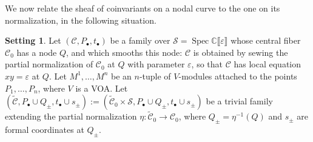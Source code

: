 \documentclass[12pt,a4paper,reqno]{amsart}
\numberwithin{equation}{section}
\theoremstyle{definition}
\newtheorem{setting}[theorem]{Setting}
\newcommand{\C}{\mathbb{C}}
\renewcommand{\S}{\mathcal{S}}
\newcommand{\CCC}{\mathscr{C}}
\newcommand{\lb}{\llbracket}
\newcommand{\rb}{\rrbracket}
\begin{document}
We now relate the sheaf of coinvariants on a nodal curve to the one on its normalization, in the following situation.
\begin{setting}\label{setting}
    Let $(\CCC, P_\bullet, t_\bullet)$ be a family over $\mathcal{S}=\operatorname{Spec} \C\lb \varepsilon\rb $ whose central fiber $\CCC_0$ has a node $Q$, and which smooths this node: $\CCC$ is obtained by sewing the partial normalization of $\CCC_0$ at $Q$ with parameter $\varepsilon$, so that $\CCC$ has local equation $xy=\varepsilon$ at $Q$. Let $M^1,\dots,M^n$ be an $n$-tuple of $V$-modules attached to the points $P_1,\dots, P_n$, where $V$ is a VOA. Let $(\widetilde{\CCC},  P_\bullet \cup Q_\pm, t_\bullet \cup s_\pm) := (\widetilde{\CCC}_0 \times \S,  P_\bullet \cup Q_\pm, t_\bullet \cup s_\pm)$ be a trivial family extending the partial normalization $\eta: \widetilde{\CCC}_0 \rightarrow \CCC_0$, where $Q_\pm = \eta^{-1}(Q)$ and $s_\pm$ are formal coordinates at $Q_\pm$.
\end{setting}
\end{document}
